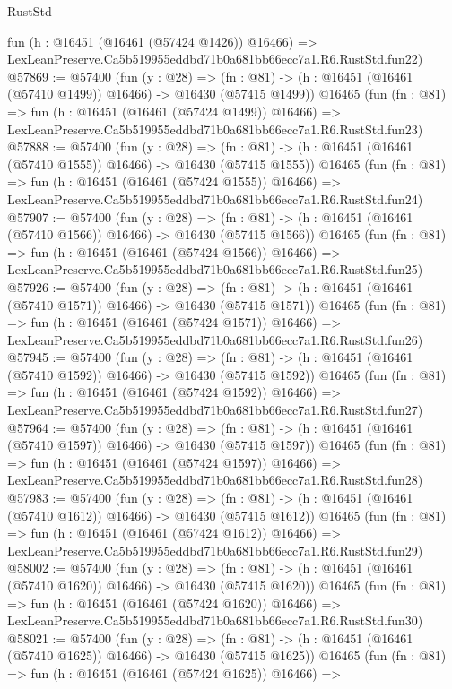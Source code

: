\begin{lexlean}{RustStd}
\begin{coremodule}
    fun (h : @16451 (@16461 (@57424 @1426)) @16466) =>
    LexLeanPreserve.Ca5b519955eddbd71b0a681bb66ecc7a1.R6.RustStd.fun22)
@57869 := @57400
    (fun (y : @28) =>
    (fn : @81) -> (h : @16451 (@16461 (@57410 @1499)) @16466) -> @16430 (@57415 @1499))
    @16465
    (fun (fn : @81) =>
    fun (h : @16451 (@16461 (@57424 @1499)) @16466) =>
    LexLeanPreserve.Ca5b519955eddbd71b0a681bb66ecc7a1.R6.RustStd.fun23)
@57888 := @57400
    (fun (y : @28) =>
    (fn : @81) -> (h : @16451 (@16461 (@57410 @1555)) @16466) -> @16430 (@57415 @1555))
    @16465
    (fun (fn : @81) =>
    fun (h : @16451 (@16461 (@57424 @1555)) @16466) =>
    LexLeanPreserve.Ca5b519955eddbd71b0a681bb66ecc7a1.R6.RustStd.fun24)
@57907 := @57400
    (fun (y : @28) =>
    (fn : @81) -> (h : @16451 (@16461 (@57410 @1566)) @16466) -> @16430 (@57415 @1566))
    @16465
    (fun (fn : @81) =>
    fun (h : @16451 (@16461 (@57424 @1566)) @16466) =>
    LexLeanPreserve.Ca5b519955eddbd71b0a681bb66ecc7a1.R6.RustStd.fun25)
@57926 := @57400
    (fun (y : @28) =>
    (fn : @81) -> (h : @16451 (@16461 (@57410 @1571)) @16466) -> @16430 (@57415 @1571))
    @16465
    (fun (fn : @81) =>
    fun (h : @16451 (@16461 (@57424 @1571)) @16466) =>
    LexLeanPreserve.Ca5b519955eddbd71b0a681bb66ecc7a1.R6.RustStd.fun26)
@57945 := @57400
    (fun (y : @28) =>
    (fn : @81) -> (h : @16451 (@16461 (@57410 @1592)) @16466) -> @16430 (@57415 @1592))
    @16465
    (fun (fn : @81) =>
    fun (h : @16451 (@16461 (@57424 @1592)) @16466) =>
    LexLeanPreserve.Ca5b519955eddbd71b0a681bb66ecc7a1.R6.RustStd.fun27)
@57964 := @57400
    (fun (y : @28) =>
    (fn : @81) -> (h : @16451 (@16461 (@57410 @1597)) @16466) -> @16430 (@57415 @1597))
    @16465
    (fun (fn : @81) =>
    fun (h : @16451 (@16461 (@57424 @1597)) @16466) =>
    LexLeanPreserve.Ca5b519955eddbd71b0a681bb66ecc7a1.R6.RustStd.fun28)
@57983 := @57400
    (fun (y : @28) =>
    (fn : @81) -> (h : @16451 (@16461 (@57410 @1612)) @16466) -> @16430 (@57415 @1612))
    @16465
    (fun (fn : @81) =>
    fun (h : @16451 (@16461 (@57424 @1612)) @16466) =>
    LexLeanPreserve.Ca5b519955eddbd71b0a681bb66ecc7a1.R6.RustStd.fun29)
@58002 := @57400
    (fun (y : @28) =>
    (fn : @81) -> (h : @16451 (@16461 (@57410 @1620)) @16466) -> @16430 (@57415 @1620))
    @16465
    (fun (fn : @81) =>
    fun (h : @16451 (@16461 (@57424 @1620)) @16466) =>
    LexLeanPreserve.Ca5b519955eddbd71b0a681bb66ecc7a1.R6.RustStd.fun30)
@58021 := @57400
    (fun (y : @28) =>
    (fn : @81) -> (h : @16451 (@16461 (@57410 @1625)) @16466) -> @16430 (@57415 @1625))
    @16465
    (fun (fn : @81) =>
    fun (h : @16451 (@16461 (@57424 @1625)) @16466) =>

\end{coremodule}
\end{lexlean}
